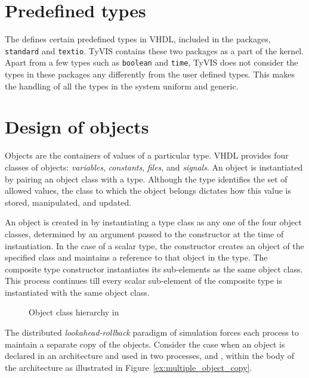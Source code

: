 \documentclass[11pt]{article}
\begin{document}
\section{Predefined types}

The \LRM\/ defines certain predefined types in VHDL, included in the
packages, \texttt{standard} and \texttt{textio}.  TyVIS contains these
two packages as a part of the kernel.  Apart from a few types such as
\texttt{boolean} and \texttt{time}, TyVIS does not consider the types
in these packages any differently from the user defined types.  This makes
the handling of all the types in the system uniform and generic.


\section{Design of objects}
\label{chp:design_objects}

Objects are the containers of values of a particular type.  VHDL
provides four classes of objects: \textit{variables},
\textit{constants}, \textit{files}, and \textit{signals}.  An object
is instantiated by pairing an object class with a type. Although the
type identifies the set of allowed values, the class to which the
object belongs dictates how this value is stored, manipulated, and
updated.

An object is created in \tyvis\/ by instantiating a type class as any one
of the four object classes, determined by an argument passed to the
constructor at the time of instantiation.  In the case of a scalar type,
the constructor creates an object of the specified class and maintains a
reference to that object in the type.  The composite type constructor
instantiates its sub-elements as the same object class.  This process
continues till every scalar sub-element of the composite type is
instantiated with the same object class.

\begin{figure}[htbp]
  \centerline{}
  \caption{Object class hierarchy in \tyvis}
  \label{fig:object_hierarchy}
\end{figure}

The distributed \textit{lookahead-rollback} paradigm of \warped\/
simulation forces each process to maintain a separate copy of the objects.
Consider the case when an object is declared in an architecture and used
in two processes, \A\/ and \B, within the body of the architecture as
illustrated in Figure~\ref{ex:multiple_object_copy}.
\end{document}
